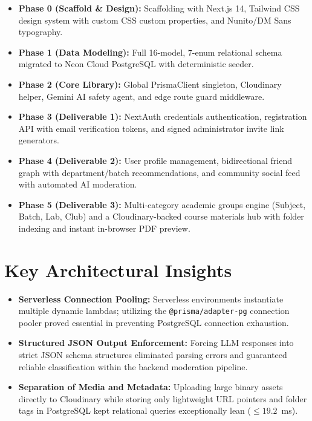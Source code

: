\documentclass[11pt,a4paper]{report}
\begin{document}
\begin{itemize}
    \item \textbf{Phase 0 (Scaffold \& Design):} Scaffolding with Next.js 14, Tailwind CSS design system with custom CSS custom properties, and Nunito/DM Sans typography.
    \item \textbf{Phase 1 (Data Modeling):} Full 16-model, 7-enum relational schema migrated to Neon Cloud PostgreSQL with deterministic seeder.
    \item \textbf{Phase 2 (Core Library):} Global PrismaClient singleton, Cloudinary helper, Gemini AI safety agent, and edge route guard middleware.
    \item \textbf{Phase 3 (Deliverable 1):} NextAuth credentials authentication, registration API with email verification tokens, and signed administrator invite link generators.
    \item \textbf{Phase 4 (Deliverable 2):} User profile management, bidirectional friend graph with department/batch recommendations, and community social feed with automated AI moderation.
    \item \textbf{Phase 5 (Deliverable 3):} Multi-category academic groups engine (Subject, Batch, Lab, Club) and a Cloudinary-backed course materials hub with folder indexing and instant in-browser PDF preview.
\end{itemize}

\section{Key Architectural Insights}

\begin{itemize}
    \item \textbf{Serverless Connection Pooling:} Serverless environments instantiate multiple dynamic lambdas; utilizing the \texttt{@prisma/adapter-pg} connection pooler proved essential in preventing PostgreSQL connection exhaustion.
    \item \textbf{Structured JSON Output Enforcement:} Forcing LLM responses into strict JSON schema structures eliminated parsing errors and guaranteed reliable classification within the backend moderation pipeline.
    \item \textbf{Separation of Media and Metadata:} Uploading large binary assets directly to Cloudinary while storing only lightweight URL pointers and folder tags in PostgreSQL kept relational queries exceptionally lean ($\leq 19.2$~ms).
\end{itemize}
\end{document}
